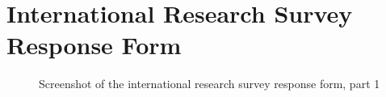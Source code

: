 \chapter{International Research Survey Response Form}

\begin{figure}[H]
    \centering
    \caption{Screenshot of the international research survey response form, part 1}
    \label{fig:s1}
\end{figure}

